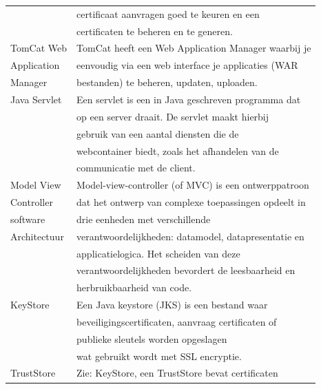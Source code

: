 \documentclass[]{article}
\begin{document}
\begin{longtable}{|| l | l ||}
                     & certificaat aanvragen goed te keuren en een          \\
                     & certificaten te beheren en te generen.               \\\hline
    TomCat Web       & TomCat heeft een Web Application Manager waarbij je  \\
    Application      & eenvoudig via een web interface je applicaties (WAR  \\
    Manager          & bestanden) te beheren, updaten, uploaden.            \\\hline
    Java Servlet     & Een servlet is een in Java geschreven programma dat  \\
                     & op een server draait. De servlet maakt hierbij       \\
                     & gebruik van een aantal diensten die de               \\
                     & webcontainer biedt, zoals het afhandelen van de      \\
                     & communicatie met de client.                          \\\hline
    Model View       & Model-view-controller (of MVC) is een ontwerppatroon \\
    Controller       & dat het ontwerp van complexe toepassingen opdeelt in \\
    software         & drie eenheden met verschillende                      \\
    Architectuur     & verantwoordelijkheden: datamodel, datapresentatie en \\
                     & applicatielogica. Het scheiden van deze              \\
                     & verantwoordelijkheden bevordert de leesbaarheid en   \\
                     & herbruikbaarheid van code.                           \\\hline
    KeyStore         & Een Java keystore (JKS) is een bestand waar          \\
                     & beveiligingscertificaten, aanvraag certificaten of   \\
                     & publieke sleutels worden opgeslagen                  \\
                     & wat gebruikt wordt met SSL encryptie.                \\\hline
    TrustStore       & Zie: KeyStore, een TrustStore bevat certificaten     \\

\end{longtable}
\end{document}

